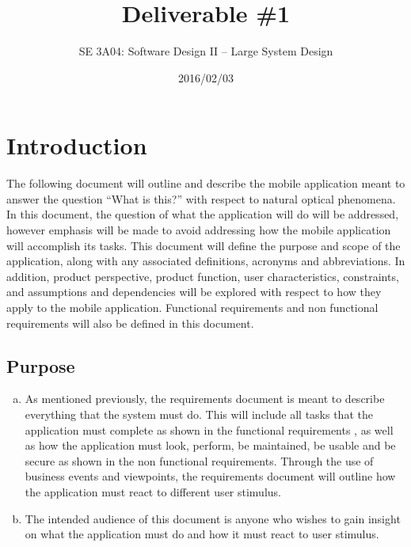 \documentclass[]{article}
\title{Deliverable \#1}
\author{SE 3A04: Software Design II -- Large System Design}
\date{2016/02/03}
\begin{document}
\maketitle	

\section{Introduction}
\label{sec:introduction}


The following document will outline and describe the mobile application meant to answer the question ``What is this?'' with respect to natural optical phenomena.  In this document, the question of what the application will do will be addressed, however emphasis will be made to avoid addressing how the mobile application will accomplish its tasks. This document will define the purpose and scope of the application, along with any associated definitions, acronyms and abbreviations. In addition, product perspective, product function, user characteristics, constraints, and assumptions and dependencies will be explored with respect to how they apply to the mobile application. Functional requirements and non functional requirements will also be defined in this document.

\subsection{Purpose}
\label{sub:purpose}
\begin{enumerate}[a)]
	\item As mentioned previously, the requirements document is meant to describe everything that the system must do. This will include all tasks that the application must complete as shown in the functional requirements , as well as how the application must look, perform, be maintained, be usable and be secure as shown in the non functional requirements. Through the use of business events and viewpoints, the requirements document will outline how the application must react to different user stimulus.
	\item The intended audience of this document is anyone who wishes to gain insight on what the application must do and how it must react to user stimulus.
\end{enumerate}
\end{document}

